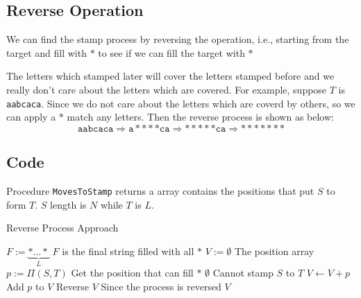 \documentclass[a4paper,12pt]{article}
\begin{document}
\subsection{Reverse Operation}
We can find the stamp process by reversing the operation, i.e., starting from the target and fill with $\ast$ to see if we can fill the target with $\ast$
\par
The letters which stamped later will cover the letters stamped before and we really don't care about the letters which are covered. For example, suppose $T$ is \texttt{aabcaca}. Since we do not care about the letters which are coverd by others, so we can apply a $\ast$ match any letters. Then the reverse process is shown as below:
\[
\texttt{aabcaca} \Rightarrow \texttt{a}\ast\ast\ast\ast\texttt{ca} \Rightarrow \ast\ast\ast\ast\ast\texttt{ca} \Rightarrow \ast\ast\ast\ast\ast\ast\ast
\]
\subsection{Code}
Procedure \texttt{MovesToStamp} returns a array contains the positions that put $S$ to form $T$. $S$ length is $N$ while $T$ is $L$.
\setcounter{algorithm}{0}
\begin{algorithm}[H]
\caption{Reverse Process Approach}
\begin{algorithmic}[1]
\State $F:=\underbrace{\ast\ldots\ast}_{L}$ \Comment $F$ is the final string filled with all $\ast$
\State $V:=\emptyset$ \Comment The position array 
\State $p:=\Pi(S, T)$ \Comment Get the position that can fill $\ast$
\State \Return $\emptyset$ \Comment Cannot stamp $S$ to $T$
\Else
\State $V\gets V+p$ \Comment Add $p$ to $V$
\EndIf
\EndWhile
\State Reverse $V$ \Comment Since the process is reversed
\State \Return $V$
\EndProcedure
\end{algorithmic}
\end{algorithm}
\end{document}
